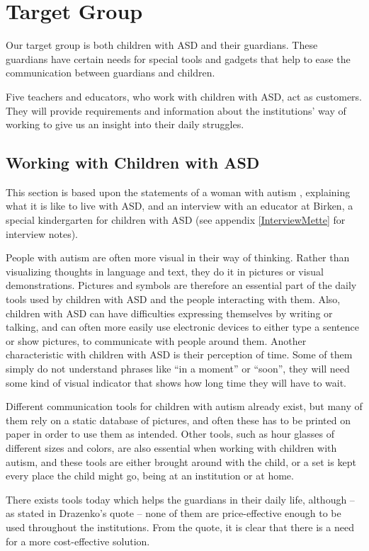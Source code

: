 \section{Target Group}
Our target group is both children with ASD and their guardians. These guardians have certain needs for special tools and gadgets that help to ease the communication between guardians and children.

Five teachers and educators, who work with children with ASD, act as customers. They will provide requirements and information about the institutions' way of working to give us an insight into their daily struggles.

\subsection{Working with Children with ASD}
This section is based upon the statements of a woman with autism \cite{autism.com}, explaining what it is like to live with ASD, and an interview with an educator at Birken, a special kindergarten for children with ASD (see appendix \ref{InterviewMette} for interview notes).

	People with autism are often more visual in their way of thinking. Rather than visualizing thoughts in language and text, they do it in pictures or visual demonstrations. Pictures and symbols are therefore an essential part of the daily tools used by children with ASD and the people interacting with them. Also, children with ASD can have difficulties expressing themselves by writing or talking, and can often more easily use electronic devices to either type a sentence or show pictures, to communicate with people around them.
	Another characteristic with children with ASD is their perception of time. Some of them simply do not understand phrases like "`in a moment"' or "`soon"', they will need some kind of visual indicator that shows how long time they will have to wait.

Different communication tools for children with autism already exist, but many of them rely on a static database of pictures, and often these has to be printed on paper in order to use them as intended. Other tools, such as hour glasses of different sizes and colors, are also essential when working with children with autism, and these tools are either brought around with the child, or a set is kept every place the child might go, being at an institution or at home.

There exists tools today which helps the guardians in their daily life, although -- as stated in Drazenko's quote -- none of them are price-effective enough to be used throughout the institutions. From the quote, it is clear that there is a need for a more cost-effective solution.

